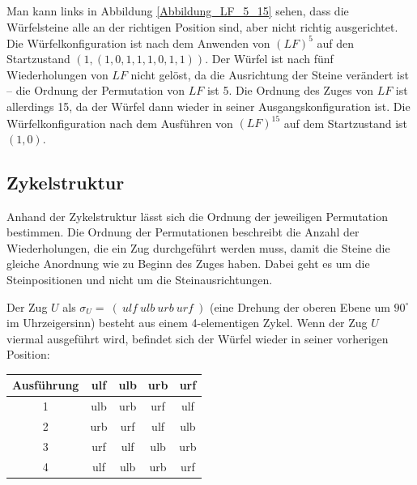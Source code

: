 \documentclass[12pt,a4paper, usenames, dvipsnames]{article}
\theoremstyle{mystyle}
\theoremstyle{definition}
\begin{document}
Man kann links in Abbildung \ref{Abbildung_LF_5_15} sehen, dass die Würfelsteine alle an der richtigen Position sind, aber nicht richtig ausgerichtet. Die Würfelkonfiguration ist nach dem Anwenden von $(LF)^5$ auf den Startzustand $(1, (1,0,1,1,1,0,1,1))$. Der Würfel ist nach fünf Wiederholungen von $LF$ nicht gelöst, da die Ausrichtung der Steine verändert ist -- die Ordnung der Permutation von $LF$ ist 5. Die Ordnung des Zuges von $LF$ ist allerdings 15, da der Würfel dann wieder in seiner Ausgangskonfiguration ist. Die Würfelkonfiguration nach dem Ausführen von $(LF)^{15}$ auf dem Startzustand ist $(1,0)$.



 
%
%
%
%
%
%
%
%
%
%
%
%
%
%
%
%
%
%
%
%


\subsection{Zykelstruktur}


Anhand der Zykelstruktur lässt sich die Ordnung der jeweiligen Permutation bestimmen. Die Ordnung der Permutationen beschreibt die Anzahl der Wiederholungen, die ein Zug durchgeführt werden muss, damit die Steine die gleiche Anordnung wie zu Beginn des Zuges haben. Dabei geht es um die Steinpositionen und nicht um die Steinausrichtungen.

Der Zug $U$ als $\sigma_U =\ ( \ \textit{ulf} \ \textit{ulb} \ \textit{urb} \ \textit{urf} \ ) $ (eine Drehung der oberen Ebene um $90^\circ$ im Uhrzeigersinn) besteht aus einem 4-elementigen Zykel.
Wenn der Zug $U$ viermal ausgeführt wird, befindet sich der Würfel wieder in seiner vorherigen Position: 
\begin{center}
\begin{tabular}{ccccc}
\toprule
\textbf{Ausführung} & \textbf{ulf} & \textbf{ulb} & \textbf{urb} & \textbf{urf} \\
\midrule
1 & ulb & urb & urf & ulf \\

2 & urb & urf & ulf & ulb \\

3 & urf & ulf & ulb & urb \\

4 & ulf & ulb & urb & urf \\
\bottomrule
\end{tabular}
\end{center}
\end{document}
